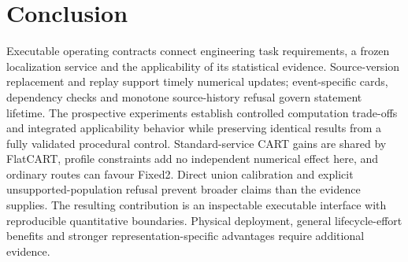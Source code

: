 \section{Conclusion}
Executable operating contracts connect engineering task requirements, a frozen localization service and the applicability of its statistical evidence. Source-version replacement and replay support timely numerical updates; event-specific cards, dependency checks and monotone source-history refusal govern statement lifetime. The prospective experiments establish controlled computation trade-offs and integrated applicability behavior while preserving identical results from a fully validated procedural control. Standard-service CART gains are shared by FlatCART, profile constraints add no independent numerical effect here, and ordinary routes can favour Fixed2. Direct union calibration and explicit unsupported-population refusal prevent broader claims than the evidence supplies. The resulting contribution is an inspectable executable interface with reproducible quantitative boundaries. Physical deployment, general lifecycle-effort benefits and stronger representation-specific advantages require additional evidence.
